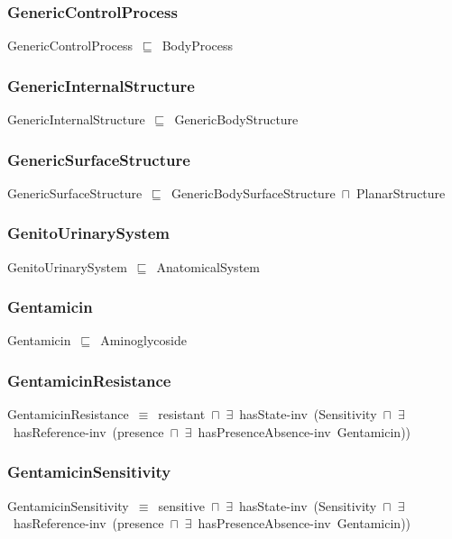 \documentclass{article}
\begin{document}
\subsubsection*{GenericControlProcess}

GenericControlProcess~\ensuremath{\sqsubseteq}~BodyProcess~

\subsubsection*{GenericInternalStructure}

GenericInternalStructure~\ensuremath{\sqsubseteq}~GenericBodyStructure~

\subsubsection*{GenericSurfaceStructure}

GenericSurfaceStructure~\ensuremath{\sqsubseteq}~GenericBodySurfaceStructure~\ensuremath{\sqcap}~PlanarStructure~

\subsubsection*{GenitoUrinarySystem}

GenitoUrinarySystem~\ensuremath{\sqsubseteq}~AnatomicalSystem~

\subsubsection*{Gentamicin}

Gentamicin~\ensuremath{\sqsubseteq}~Aminoglycoside~

\subsubsection*{GentamicinResistance}

GentamicinResistance~\ensuremath{\equiv}~resistant~\ensuremath{\sqcap}~\ensuremath{\exists}~hasState-inv~(Sensitivity~\ensuremath{\sqcap}~\ensuremath{\exists}~hasReference-inv~(presence~\ensuremath{\sqcap}~\ensuremath{\exists}~hasPresenceAbsence-inv~Gentamicin))

\subsubsection*{GentamicinSensitivity}

GentamicinSensitivity~\ensuremath{\equiv}~sensitive~\ensuremath{\sqcap}~\ensuremath{\exists}~hasState-inv~(Sensitivity~\ensuremath{\sqcap}~\ensuremath{\exists}~hasReference-inv~(presence~\ensuremath{\sqcap}~\ensuremath{\exists}~hasPresenceAbsence-inv~Gentamicin))
\end{document}
